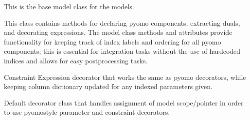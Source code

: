 \documentclass[letterpaper,10pt,english]{sphinxmanual}
\begin{document}
\begin{fulllineitems}
\label{\detokenize{src.common.model:src.common.model.Model}}
\pysigstartsignatures
\pysiglinewithargsret
{}
{\sphinxparamcomma {}}
{}
\pysigstopsignatures
\sphinxAtStartPar
This is the base model class for the models.

\sphinxAtStartPar
This class contains methods for declaring pyomo components, extracting duals, and
decorating expressions. The model class methods and attributes provide functionality
for keeping track of index labels and ordering for all pyomo components; this is
essential for integration tasks without the use of hard\sphinxhyphen{}coded indices and allows for
easy post\sphinxhyphen{}processing tasks.

\begin{fulllineitems}
\label{\detokenize{src.common.model:src.common.model.Model.ConstraintExpression}}
\pysigstartsignatures
\pysiglinewithargsret
{}
{\sphinxparamcomma {}}
{}
\pysigstopsignatures
\sphinxAtStartPar
Constraint Expression decorator that works the same as pyomo decorators, while keeping
column dictionary updated for any indexed parameters given.

\end{fulllineitems}


\begin{fulllineitems}
\label{\detokenize{src.common.model:src.common.model.Model.DefaultDecorator}}
\pysigstartsignatures
\pysiglinewithargsret
{}
{\sphinxparamcomma {}\sphinxparamcomma {}}
{}
\pysigstopsignatures
\sphinxAtStartPar
Default decorator class that handles assignment of model scope/pointer in order to use
pyomo\sphinxhyphen{}style parameter and constraint decorators.


\end{fulllineitems}
\end{fulllineitems}
\end{document}
